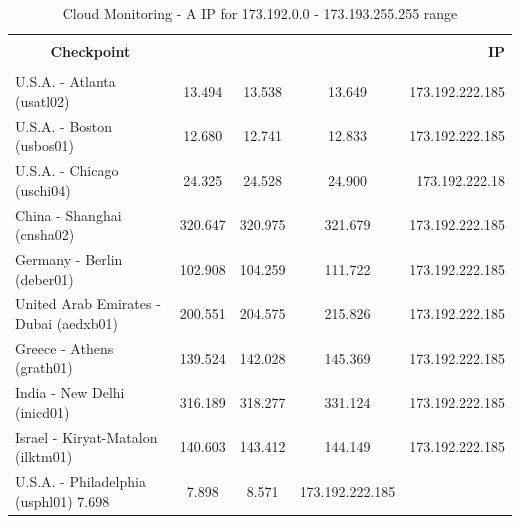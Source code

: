 \documentclass[a4paper,11pt]{book}
\begin{document}
\begin{table}
\label{table:Monitoring_2}
\begin{tabular}{|l|c|c|c|r|}
\hline
\multicolumn{1}{|c|}{\textbf{}} & {\textbf{}} & {\textbf{}} & {\textbf{}} & {\textbf{}}\\
\multicolumn{1}{|c|}{\textbf{Checkpoint}} & {\textbf{RTT minimo} & {\textbf{RTT medio} & {\textbf{RTT massimo} & {\textbf{IP}}\\
\multicolumn{1}{|c|}{\textbf{}} & {\textbf{}} & {\textbf{}} & {\textbf{}} & {\textbf{}}\\
\hline
U.S.A. - Atlanta (usatl02) & 13.494 & 13.538 & 13.649 & 173.192.222.185\\
U.S.A. - Boston (usbos01) & 12.680 & 12.741 & 12.833 & 173.192.222.185\\
U.S.A. - Chicago (uschi04) & 24.325 & 24.528 & 24.900 & 173.192.222.18\\
China - Shanghai (cnsha02) & 320.647 & 320.975 & 321.679 & 173.192.222.185\\
Germany - Berlin (deber01) & 102.908 & 104.259 & 111.722 & 173.192.222.185\\
United Arab Emirates - Dubai (aedxb01) & 200.551 & 204.575 & 215.826 & 173.192.222.185\\
Greece - Athens (grath01) & 139.524 & 142.028 & 145.369 & 173.192.222.185\\
India - New Delhi (inicd01) & 316.189 & 318.277 & 331.124 & 173.192.222.185\\
Israel - Kiryat-Matalon (ilktm01) & 140.603 & 143.412 & 144.149 & 173.192.222.185\\
U.S.A. - Philadelphia (usphl01)	7.698 & 7.898 & 8.571 & 173.192.222.185\\
\hline
\end{tabular}
\caption{Cloud Monitoring - A IP for 173.192.0.0 - 173.193.255.255 range}
\end{table}

~
\end{document}
